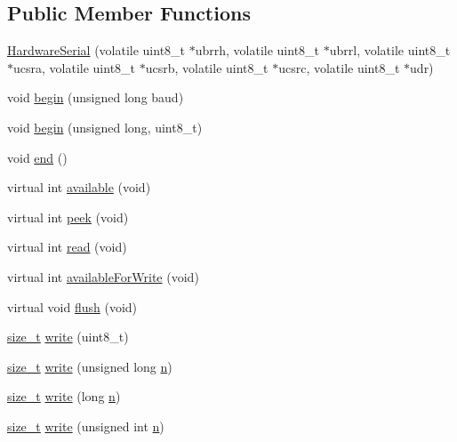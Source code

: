 \subsection*{Public Member Functions}
\begin{DoxyCompactItemize}
\item 
\hyperlink{classHardwareSerial_a89894dd01eb368e1a9f16319c2a149ca}{Hardware\-Serial} (volatile uint8\-\_\-t $\ast$ubrrh, volatile uint8\-\_\-t $\ast$ubrrl, volatile uint8\-\_\-t $\ast$ucsra, volatile uint8\-\_\-t $\ast$ucsrb, volatile uint8\-\_\-t $\ast$ucsrc, volatile uint8\-\_\-t $\ast$udr)
\item 
void \hyperlink{classHardwareSerial_a288e8a54617bc6c3ebbcaa4ef8dc9efa}{begin} (unsigned long baud)
\item 
void \hyperlink{classHardwareSerial_aad4db7a746742b1023a6157419d9b63c}{begin} (unsigned long, uint8\-\_\-t)
\item 
void \hyperlink{classHardwareSerial_a0f86c41f580e04bdf30ea00e9014eacd}{end} ()
\item 
virtual int \hyperlink{classHardwareSerial_a7c25d36b6e41f217bed05a45158fabc2}{available} (void)
\item 
virtual int \hyperlink{classHardwareSerial_a9e7c5f787de18c5b33d00c2f1cb3dd8d}{peek} (void)
\item 
virtual int \hyperlink{classHardwareSerial_a618696608a5fddcf3cb48ad6f044e756}{read} (void)
\item 
virtual int \hyperlink{classHardwareSerial_a3cca52f62bbf985aec2fc18ecfb6099b}{available\-For\-Write} (void)
\item 
virtual void \hyperlink{classHardwareSerial_a1eeb094d8da77e0292f95f4498a5396f}{flush} (void)
\item 
\hyperlink{stddef_8h_aa9d55e2f20e580b7445617d0d12fff6e}{size\-\_\-t} \hyperlink{classHardwareSerial_aaac7141b435adbea3bf960acc0c40267}{write} (uint8\-\_\-t)
\item 
\hyperlink{stddef_8h_aa9d55e2f20e580b7445617d0d12fff6e}{size\-\_\-t} \hyperlink{classHardwareSerial_a16f45867c871788b2440696531f79839}{write} (unsigned long \hyperlink{OWGeneric__SensorStation_8ino_a7f72c6c4ce2ae87fa6fe5f6f22cd9d67}{n})
\item 
\hyperlink{stddef_8h_aa9d55e2f20e580b7445617d0d12fff6e}{size\-\_\-t} \hyperlink{classHardwareSerial_ade858bfb5ab807abc646fec974c00435}{write} (long \hyperlink{OWGeneric__SensorStation_8ino_a7f72c6c4ce2ae87fa6fe5f6f22cd9d67}{n})
\item 
\hyperlink{stddef_8h_aa9d55e2f20e580b7445617d0d12fff6e}{size\-\_\-t} \hyperlink{classHardwareSerial_aefe3473ecb98923c9d7e9f9d18604727}{write} (unsigned int \hyperlink{OWGeneric__SensorStation_8ino_a7f72c6c4ce2ae87fa6fe5f6f22cd9d67}{n})

\end{DoxyCompactItemize}
